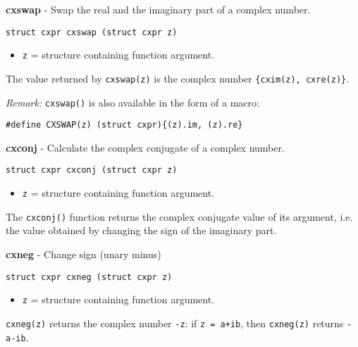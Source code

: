 \documentclass{article}
\begin{document}
\hrulefill{}

\textbf{cxswap} - Swap the real and the imaginary part
of a complex number.

\begin{verbatim}
struct cxpr cxswap (struct cxpr z)
\end{verbatim}

\begin{itemize}
\item \texttt{z} = structure containing function argument.
\end{itemize}

The value returned by \texttt{cxswap(z)} is the complex
number \texttt{\{cxim(z), cxre(z)\}}.

\textit{Remark:}
\texttt{cxswap()} is also available in the form of a macro:

\begin{verbatim}
#define CXSWAP(z) (struct cxpr){(z).im, (z).re}
\end{verbatim}

\hrulefill{}

\textbf{cxconj} - Calculate the complex conjugate of a complex number.

\begin{verbatim}
struct cxpr cxconj (struct cxpr z)
\end{verbatim}

\begin{itemize}
\item \texttt{z} = structure containing function argument.
\end{itemize}

The \texttt{cxconj()} function returns the complex conjugate value of
its argument, i.e. the value obtained by changing the sign of the
imaginary part.


\hrulefill{}

\textbf{cxneg} - Change sign (unary minus)

\begin{verbatim}
struct cxpr cxneg (struct cxpr z)
\end{verbatim}

\begin{itemize}
\item \texttt{z} = structure containing function argument.
\end{itemize}

\texttt{cxneg(z)} returns the complex number \texttt{-z}: if
\texttt{z = a+ib}, then \texttt{cxneg(z)} returns \texttt{-a-ib}.
\end{document}
